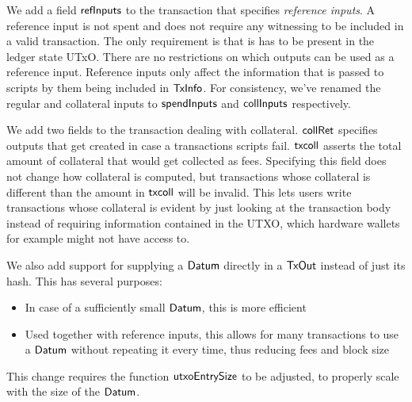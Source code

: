 We add a field $\mathsf{refInputs}$ to the transaction that specifies
\emph{reference inputs}. A reference input is not spent and does not
require any witnessing to be included in a valid transaction. The only
requirement is that is has to be present in the ledger state
UTxO. There are no restrictions on which outputs can be used as a
reference input. Reference inputs only affect the information that is
passed to scripts by them being included in $\mathsf{TxInfo}$. 
For consistency, we've renamed the regular and collateral inputs to
$\mathsf{spendInputs}$ and $\mathsf{collInputs}$ respectively.

We add two fields to the transaction dealing with
collateral. $\mathsf{collRet}$ specifies outputs that get created in case
a transactions scripts fail. $\mathsf{txcoll}$ asserts the total amount
of collateral that would get collected as fees. Specifying this field
does not change how collateral is computed, but transactions whose
collateral is different than the amount in $\mathsf{txcoll}$ will be
invalid. This lets users write transactions whose collateral is
evident by just looking at the transaction body instead of requiring
information contained in the UTXO, which hardware wallets for example
might not have access to.

We also add support for supplying a $\mathsf{Datum}$ directly in a $\mathsf{TxOut}$
instead of just its hash. This has several purposes:
\begin{itemize}
\item In case of a sufficiently small $\mathsf{Datum}$, this is more efficient
\item Used together with reference inputs, this allows for many
  transactions to use a $\mathsf{Datum}$ without repeating it every time, thus
  reducing fees and block size
\end{itemize}
This change requires the function $\mathsf{utxoEntrySize}$ to be
adjusted, to properly scale with the size of the $\mathsf{Datum}$. 
